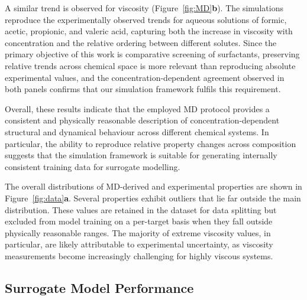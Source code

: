 \documentclass[11pt]{aime}
\begin{document}
A similar trend is observed for viscosity (Figure~\ref{fig:MD}\textbf{b}).
The simulations reproduce the experimentally observed trends for aqueous solutions of formic, acetic, propionic, and valeric acid, capturing both the increase in viscosity with concentration and the relative ordering between different solutes.
Since the primary objective of this work is comparative screening of surfactants, preserving relative trends across chemical space is more relevant than reproducing absolute experimental values, and the concentration-dependent agreement observed in both panels confirms that our simulation framework fulfils this requirement.

Overall, these results indicate that the employed MD protocol provides a consistent and physically reasonable description of concentration-dependent structural and dynamical behaviour across different chemical systems.
In particular, the ability to reproduce relative property changes across composition suggests that the simulation framework is suitable for generating internally consistent training data for surrogate modelling.

The overall distributions of MD-derived and experimental properties are shown in Figure~\ref{fig:data}\textbf{a}.
Several properties exhibit outliers that lie far outside the main distribution.
These values are retained in the dataset for data splitting but excluded from model training on a per-target basis when they fall outside physically reasonable ranges.
The majority of extreme viscosity values, in particular, are likely attributable to experimental uncertainty, as viscosity measurements become increasingly challenging for highly viscous systems.


\subsection{Surrogate Model Performance}
\end{document}
